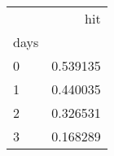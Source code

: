 \begin{tabular}{lr}
\toprule
{} &       hit \\
days &           \\
\midrule
0    &  0.539135 \\
1    &  0.440035 \\
2    &  0.326531 \\
3    &  0.168289 \\
\bottomrule
\end{tabular}
